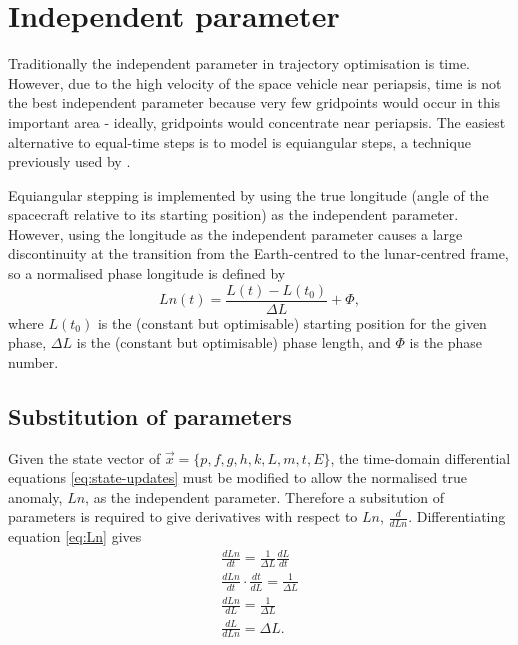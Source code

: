 \section{Independent parameter} \label{sec:Independent-parameter}

Traditionally the independent parameter in trajectory optimisation is time. However, due to the high velocity of the space vehicle near periapsis, time is not the best independent parameter because very few gridpoints would occur in this important area - ideally, gridpoints would concentrate near periapsis. The easiest alternative to equal-time steps is to model is equiangular steps, a technique previously used by \textcite{Betts2003}. 

Equiangular stepping is implemented by using the true longitude (angle of the spacecraft relative to its starting position) as the independent parameter. However, using the longitude as the independent parameter causes a large discontinuity at the transition from the Earth-centred to the lunar-centred frame, so a normalised phase longitude is defined by
\begin{equation}
Ln(t) = \frac{L(t)-L(t_0)}{\Delta L}+\Phi \label{eq:Ln},
\end{equation}
where $L(t_0)$ is the (constant but optimisable) starting position for the given phase, $\Delta L$ is the (constant but optimisable) phase length, and $\Phi$ is the phase number. 

\subsection{Substitution of parameters}\label{sub:subst-param}

Given the state vector of $\vec{x}=\{p,f,g,h,k,L,m,t,E\}$, the time-domain differential equations \eqref{eq:state-updates} must be modified to allow the normalised true anomaly, $Ln$, as the independent parameter. Therefore a subsitution of parameters is required to give derivatives with respect to $Ln$, $\frac{d}{dLn}$. Differentiating equation \eqref{eq:Ln} gives
\begin{subequations} \label{eq:dLndt}
\begin{gather}
\frac{dLn}{dt}=\frac{1}{\Delta L}\frac{dL}{dt} \\
\frac{dLn}{dt}\cdot\frac{dt}{dL}=\frac{1}{\Delta L} \\
\frac{dLn}{dL}=\frac{1}{\Delta L} \\
\frac{dL}{dLn}=\Delta L.
\end{gather}
\end{subequations}

